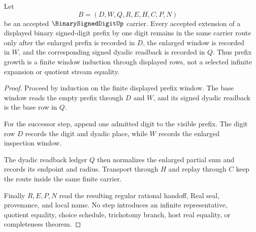 \begin{theorem}
\label{thm:binary-signed-digit-window-induction}
Let
$$
B=(D,W,Q,R,E,H,C,P,N)
$$
be an accepted $\BinarySignedDigitUp$ carrier. Every accepted extension of a displayed binary signed-digit prefix by one digit remains in the same carrier route only after the enlarged prefix is recorded in $D$, the enlarged window is recorded in $W$, and the corresponding signed dyadic readback is recorded in $Q$. Thus prefix growth is a finite window induction through displayed rows, not a selected infinite expansion or quotient stream equality.
\end{theorem}
\begin{proof}
Proceed by induction on the finite displayed prefix window. The base window reads the empty prefix through $D$ and $W$, and its signed dyadic readback is the base row in $Q$.

For the successor step, append one admitted digit to the visible prefix. The digit row $D$ records the digit and dyadic place, while $W$ records the enlarged inspection window.

The dyadic readback ledger $Q$ then normalizes the enlarged partial sum and records its endpoint and radius. Transport through $H$ and replay through $C$ keep the route inside the same finite carrier.

Finally $R,E,P,N$ read the resulting regular rational handoff, Real seal, provenance, and local name. No step introduces an infinite representative, quotient equality, choice schedule, trichotomy branch, host real equality, or completeness theorem.
\end{proof}

